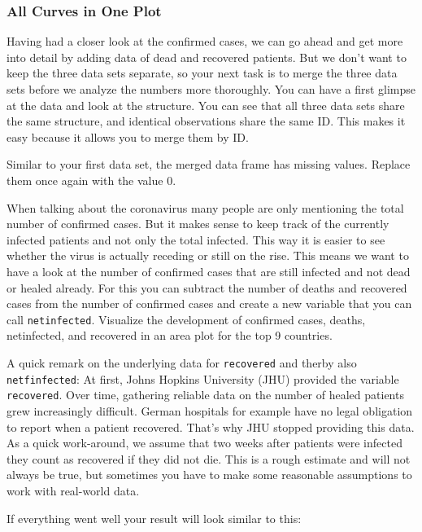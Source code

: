 \documentclass[
  11pt,
]{article}
\begin{document}
\hypertarget{all-curves-in-one-plot}{%
\subsubsection{All Curves in One Plot}\label{all-curves-in-one-plot}}

Having had a closer look at the confirmed cases, we can go ahead and get more into detail by adding data of dead and recovered patients. But we don't want to keep the three data sets separate, so your next task is to merge the three data sets before we analyze the numbers more thoroughly. You can have a first glimpse at the data and look at the structure. You can see that all three data sets share the same structure, and identical observations share the same ID. This makes it easy because it allows you to merge them by ID.

Similar to your first data set, the merged data frame has missing values. Replace them once again with the value 0.

When talking about the coronavirus many people are only mentioning the total number of confirmed cases. But it makes sense to keep track of the currently infected patients and not only the total infected. This way it is easier to see whether the virus is actually receding or still on the rise. This means we want to have a look at the number of confirmed cases that are still infected and not dead or healed already. For this you can subtract the number of deaths and recovered cases from the number of confirmed cases and create a new variable that you can call \texttt{netinfected}. Visualize the development of confirmed cases, deaths, netinfected, and recovered in an area plot for the top 9 countries.

A quick remark on the underlying data for \texttt{recovered} and therby also \texttt{netfinfected}: At first, Johns Hopkins University (JHU) provided the variable \texttt{recovered}. Over time, gathering reliable data on the number of healed patients grew increasingly difficult.
German hospitals for example have no legal obligation to report when a patient recovered.
That's why JHU stopped providing this data. As a quick work-around, we assume that two weeks after patients were infected they count as recovered if they did not die. This is a rough estimate and will not always be true, but sometimes you have to make some reasonable assumptions to work with real-world data.

If everything went well your result will look similar to this:
\end{document}
